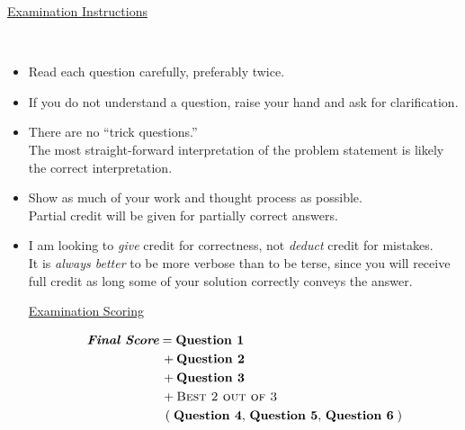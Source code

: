 \documentclass{ExamCUNY}
\newcommand{\?}{\stackrel{?}{=}}
\begin{document}
\clearpage%
%  
\begin{center}
{\Huge \underline{Examination Instructions}}
\end{center}
~\vspace*{5mm}
{\Large
\begin{itemize}
\item Read each question carefully, preferably twice.
\item If you do not understand a question, raise your hand and ask for clarification.
\item There are no ``trick questions.''\\
The most straight-forward interpretation of the problem statement is likely the correct interpretation.
\item Show as much of your work and thought process as possible.\\
Partial credit will be given for partially correct answers.
\item I am looking to \emph{give} credit for correctness, not \emph{deduct} credit for mistakes.\\
It is \emph{always better} to be more verbose than to be terse, since you will receive full credit as long some of your solution correctly conveys the answer.
\vspace*{5cm}
\begin{center}
{\Huge \underline{Examination Scoring}}
\end{center}
\begin{align*}
\textit{\textbf{Final Score}} &= \textbf{Question 1}\\
&\,+ \textbf{Question 2}\\
&\,+ \textbf{Question 3}\\
&\,+ \textsc{Best~2~out~of~3}\\
&~\left(\;\textbf{Question 4},\,\textbf{Question 5},\,\textbf{Question 6}\;\right)
\end{align*}
\end{itemize}
}



\newcommand{\ExamObject}[2]{%
{\Large \underline{\textbf{|~#1}}}\\[5mm]%
{\Large #2}\\[5mm]%
}


\clearpage%
\end{document}
